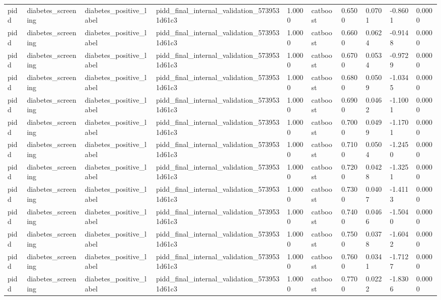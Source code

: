 \begin{tabular}{llllllllll}
pidd & diabetes\_screening & diabetes\_positive\_label & pidd\_final\_internal\_validation\_5739531d61c3 & 1.0000 & catboost & 0.6500 & 0.0701 & -0.8601 & 0.0000 \\
pidd & diabetes\_screening & diabetes\_positive\_label & pidd\_final\_internal\_validation\_5739531d61c3 & 1.0000 & catboost & 0.6600 & 0.0624 & -0.9148 & 0.0000 \\
pidd & diabetes\_screening & diabetes\_positive\_label & pidd\_final\_internal\_validation\_5739531d61c3 & 1.0000 & catboost & 0.6700 & 0.0534 & -0.9729 & 0.0000 \\
pidd & diabetes\_screening & diabetes\_positive\_label & pidd\_final\_internal\_validation\_5739531d61c3 & 1.0000 & catboost & 0.6800 & 0.0509 & -1.0345 & 0.0000 \\
pidd & diabetes\_screening & diabetes\_positive\_label & pidd\_final\_internal\_validation\_5739531d61c3 & 1.0000 & catboost & 0.6900 & 0.0462 & -1.1001 & 0.0000 \\
pidd & diabetes\_screening & diabetes\_positive\_label & pidd\_final\_internal\_validation\_5739531d61c3 & 1.0000 & catboost & 0.7000 & 0.0499 & -1.1701 & 0.0000 \\
pidd & diabetes\_screening & diabetes\_positive\_label & pidd\_final\_internal\_validation\_5739531d61c3 & 1.0000 & catboost & 0.7100 & 0.0504 & -1.2450 & 0.0000 \\
pidd & diabetes\_screening & diabetes\_positive\_label & pidd\_final\_internal\_validation\_5739531d61c3 & 1.0000 & catboost & 0.7200 & 0.0428 & -1.3251 & 0.0000 \\
pidd & diabetes\_screening & diabetes\_positive\_label & pidd\_final\_internal\_validation\_5739531d61c3 & 1.0000 & catboost & 0.7300 & 0.0407 & -1.4113 & 0.0000 \\
pidd & diabetes\_screening & diabetes\_positive\_label & pidd\_final\_internal\_validation\_5739531d61c3 & 1.0000 & catboost & 0.7400 & 0.0466 & -1.5040 & 0.0000 \\
pidd & diabetes\_screening & diabetes\_positive\_label & pidd\_final\_internal\_validation\_5739531d61c3 & 1.0000 & catboost & 0.7500 & 0.0378 & -1.6042 & 0.0000 \\
pidd & diabetes\_screening & diabetes\_positive\_label & pidd\_final\_internal\_validation\_5739531d61c3 & 1.0000 & catboost & 0.7600 & 0.0341 & -1.7127 & 0.0000 \\
pidd & diabetes\_screening & diabetes\_positive\_label & pidd\_final\_internal\_validation\_5739531d61c3 & 1.0000 & catboost & 0.7700 & 0.0222 & -1.8306 & 0.0000 \\

\end{tabular}
